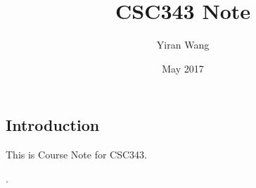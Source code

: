 \documentclass{article}
\title{CSC343 Note}
\author{Yiran Wang}
\date{May 2017}
\begin{document}
\begin{CJK*}{UTF8}{gbsn}
\maketitle

\section{Introduction}
This is Course Note for CSC343.\tableofcontents{}












\end{CJK*}.
\end{document}
